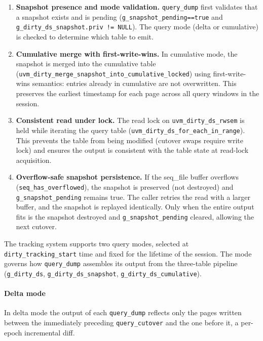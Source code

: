 \begin{enumerate}
    \item \textbf{Snapshot presence and mode validation.}
          \texttt{query\_dump} first validates that a snapshot exists and is
          pending (\texttt{g\_snapshot\_pending==true} and
          \texttt{g\_dirty\_ds\_snapshot.priv != NULL}). The query mode
          (delta or cumulative) is checked to determine which table to emit.

    \item \textbf{Cumulative merge with first-write-wins.}
          In cumulative mode, the snapshot is merged into the cumulative table
          (\texttt{uvm\_dirty\_merge\_snapshot\_into\_cumulative\_locked})
          using first-write-wins semantics: entries already in cumulative are
          not overwritten. This preserves the earliest timestamp for each page
          across all query windows in the session.

    \item \textbf{Consistent read under lock.}
          The read lock on \texttt{uvm\_dirty\_ds\_rwsem} is held while
          iterating the query table (\texttt{uvm\_dirty\_ds\_for\_each\_in\_range}).
          This prevents the table from being modified (cutover swaps require
          write lock) and ensures the output is consistent with the table state
          at read-lock acquisition.

    \item \textbf{Overflow-safe snapshot persistence.}
          If the seq\_file buffer overflows (\texttt{seq\_has\_overflowed}),
          the snapshot is preserved (not destroyed) and \texttt{g\_snapshot\_pending}
          remains true. The caller retries the read with a larger buffer, and
          the snapshot is replayed identically. Only when the entire output fits
          is the snapshot destroyed and \texttt{g\_snapshot\_pending} cleared,
          allowing the next cutover.
\end{enumerate}


The tracking system supports two query modes, selected at \texttt{dirty\_tracking\_start}
time and fixed for the lifetime of the session.
The mode governs how \texttt{query\_dump} assembles its output from the
three-table pipeline (\texttt{g\_dirty\_ds}, \texttt{g\_dirty\_ds\_snapshot},
\texttt{g\_dirty\_ds\_cumulative}).

\paragraph{Delta mode}
In delta mode the output of each \texttt{query\_dump} reflects only the pages
written between the immediately preceding \texttt{query\_cutover} and the one
before it, a per-epoch incremental diff.

